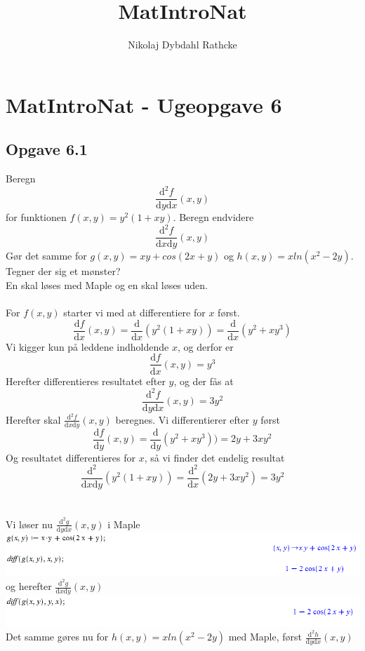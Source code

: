\documentclass[12pt]{article}
\title{MatIntroNat}
\author{Nikolaj Dybdahl Rathcke}
\begin{document}
\section*{MatIntroNat - Ugeopgave 6}

\subsection*{Opgave 6.1}
Beregn
$$\frac{\mathrm{d}^2f}{\mathrm{d} y\mathrm{d} x}(x,y)$$
for funktionen $f(x,y)=y^2(1+xy)$. Beregn endvidere
$$\frac{\mathrm{d}^2f}{\mathrm{d}x\mathrm{d}y}(x,y)$$
Gør det samme for $g(x,y)=xy+cos(2x+y)$ og $h(x,y)=xln(x^2-2y)$. Tegner der sig et mønster?\\
En skal løses med Maple og en skal løses uden.\\
\\
For $f(x,y)$ starter vi med at differentiere for $x$ først.
$$\frac{\mathrm{d}f}{\mathrm{d} x}(x,y)=\frac{\mathrm{d}}{\mathrm{d} x}(y^2(1+xy))=\frac{\mathrm{d}}{\mathrm{d} x}(y^2+xy^3)$$
Vi kigger kun på leddene indholdende $x$, og derfor er
$$\frac{\mathrm{d}f}{\mathrm{d} x}(x,y)=y^3$$
Herefter differentieres resultatet efter $y$, og der fås at
$$\frac{\mathrm{d}^2f}{\mathrm{d} y\mathrm{d} x}(x,y)=3y^2$$
Herefter skal $\frac{\mathrm{d}^2f}{\mathrm{d}x\mathrm{d}y}(x,y)$ beregnes. Vi differentierer efter $y$ først
$$\frac{\mathrm{d}f}{\mathrm{d} y}(x,y)=\frac{\mathrm{d}}{\mathrm{d} y}(y^2+xy^3))=2y+3xy^2$$
Og resultatet differentieres for $x$, så vi finder det endelig resultat
$$\frac{\mathrm{d}^2}{\mathrm{d}x\mathrm{d}y}(y^2(1+xy))=\frac{\mathrm{d}^2}{\mathrm{d} x}(2y+3xy^2)=3y^2$$
\\
\\
Vi løser nu $\frac{\mathrm{d}^2g}{\mathrm{d} y\mathrm{d} x}(x,y)$ i Maple\\
\includegraphics[scale=0.6]{Pic1}\\
og herefter $\frac{\mathrm{d}^2g}{\mathrm{d}x\mathrm{d}y}(x,y)$\\
\includegraphics[scale=0.6]{Pic2}\\
Det samme gøres nu for $h(x,y)=xln(x^2-2y)$ med Maple, først $\frac{\mathrm{d}^2h}{\mathrm{d} y\mathrm{d} x}(x,y)$ \\
\end{document}
